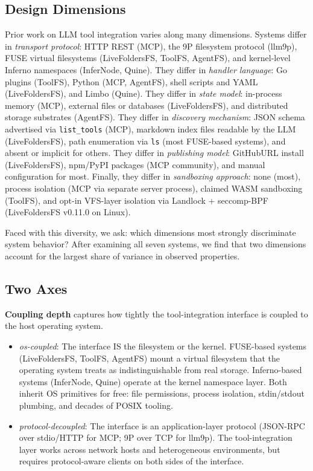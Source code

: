 \documentclass[
  11pt,
]{article}
\providecommand{\tightlist}{%
  \setlength{\itemsep}{0pt}\setlength{\parskip}{0pt}}
\begin{document}
\hypertarget{design-dimensions}{%
\subsection{Design Dimensions}\label{design-dimensions}}

Prior work on LLM tool integration varies along many dimensions. Systems
differ in \emph{transport protocol}: HTTP REST (MCP), the 9P filesystem
protocol (llm9p), FUSE virtual filesystems (LiveFoldersFS, ToolFS,
AgentFS), and kernel-level Inferno namespaces (InferNode, Quine). They
differ in \emph{handler language}: Go plugins (ToolFS), Python (MCP,
AgentFS), shell scripts and YAML (LiveFoldersFS), and Limbo (Quine).
They differ in \emph{state model}: in-process memory (MCP), external
files or databases (LiveFoldersFS), and distributed storage substrates
(AgentFS). They differ in \emph{discovery mechanism}: JSON schema
advertised via \texttt{list\_tools} (MCP), markdown index files readable
by the LLM (LiveFoldersFS), path enumeration via \texttt{ls} (most
FUSE-based systems), and absent or implicit for others. They differ in
\emph{publishing model}: GitHubURL install (LiveFoldersFS), npm/PyPI
packages (MCP community), and manual configuration for most. Finally,
they differ in \emph{sandboxing approach}: none (most), process
isolation (MCP via separate server process), claimed WASM sandboxing
(ToolFS), and opt-in VFS-layer isolation via Landlock + seccomp-BPF
(LiveFoldersFS v0.11.0 on Linux).

Faced with this diversity, we ask: which dimensions most strongly
discriminate system behavior? After examining all seven systems, we find
that two dimensions account for the largest share of variance in
observed properties.

\hypertarget{two-axes}{%
\subsection{Two Axes}\label{two-axes}}

\textbf{Coupling depth} captures how tightly the tool-integration
interface is coupled to the host operating system.

\begin{itemize}
\tightlist
\item
  \emph{os-coupled}: The interface IS the filesystem or the kernel.
  FUSE-based systems (LiveFoldersFS, ToolFS, AgentFS) mount a virtual
  filesystem that the operating system treats as indistinguishable from
  real storage. Inferno-based systems (InferNode, Quine) operate at the
  kernel namespace layer. Both inherit OS primitives for free: file
  permissions, process isolation, stdin/stdout plumbing, and decades of
  POSIX tooling.
\item
  \emph{protocol-decoupled}: The interface is an application-layer
  protocol (JSON-RPC over stdio/HTTP for MCP; 9P over TCP for llm9p).
  The tool-integration layer works across network hosts and
  heterogeneous environments, but requires protocol-aware clients on
  both sides of the interface.
\end{itemize}
\end{document}
